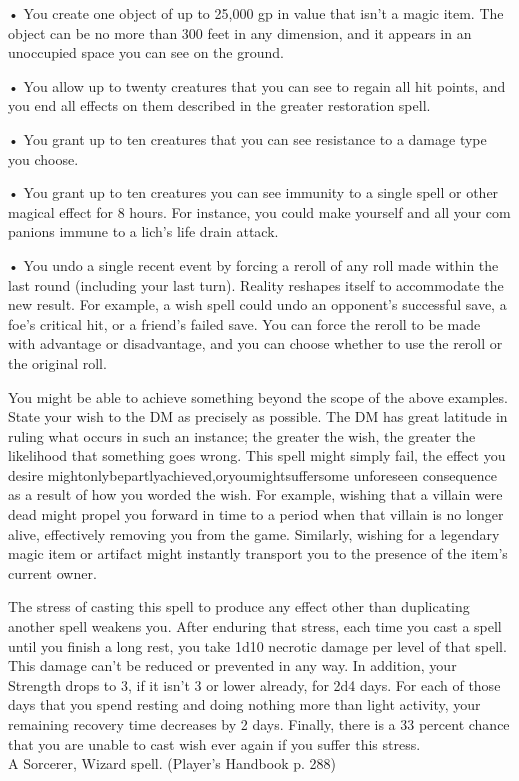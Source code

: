 \documentclass[10pt,twocolumn]{report}
\begin{document}
• You create one object of up to 25,000 gp in value that isn’t a magic item. The object can be no more than 300 feet in any dimension, and it appears in an unoccupied space you can see on the ground.

• You allow up to twenty creatures that you can see to regain all hit points, and you end all effects on them described in the greater restoration spell.

• You grant up to ten creatures that you can see resistance to a damage type you choose.

• You grant up to ten creatures you can see immunity to a single spell or other magical effect for 8 hours. For instance, you could make yourself and all your com panions immune to a lich’s life drain attack.

• You undo a single recent event by forcing a reroll of any roll made within the last round (including your last turn). Reality reshapes itself to accommodate the new result. For example, a wish spell could undo an opponent’s successful save, a foe’s critical hit, or a friend’s failed save. You can force the reroll to be made with advantage or disadvantage, and you can choose whether to use the reroll or the original roll.

You might be able to achieve something beyond the scope of the above examples. State your wish to the DM as precisely as possible. The DM has great latitude in ruling what occurs in such an instance; the greater the wish, the greater the likelihood that something goes wrong. This spell might simply fail, the effect you desire mightonlybepartlyachieved,oryoumightsuffersome unforeseen consequence as a result of how you worded the wish. For example, wishing that a villain were dead might propel you forward in time to a period when that villain is no longer alive, effectively removing you from the game. Similarly, wishing for a legendary magic item or artifact might instantly transport you to the presence of the item’s current owner.

The stress of casting this spell to produce any effect other than duplicating another spell weakens you. After enduring that stress, each time you cast a spell until you finish a long rest, you take 1d10 necrotic damage per level of that spell. This damage can’t be reduced or prevented in any way. In addition, your Strength drops to 3, if it isn’t 3 or lower already, for 2d4 days. For each of those days that you spend resting and doing nothing more than light activity, your remaining recovery time decreases by 2 days. Finally, there is a 33 percent chance that you are unable to cast wish ever again if you suffer this stress.\\
A Sorcerer, Wizard spell. (Player's Handbook p. 288) \\
\end{document}
